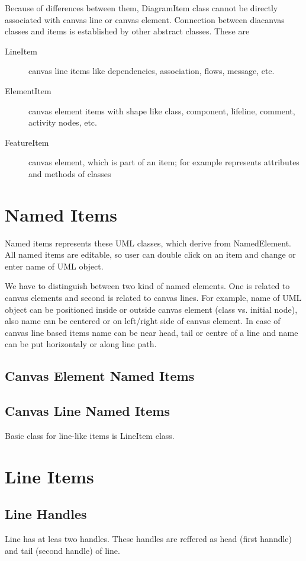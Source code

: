 \documentclass[draft]{article}
\begin{document}
Because of differences between them, DiagramItem class cannot be directly
associated with canvas line or canvas element. Connection between diacanvas
classes and items is established by other abstract classes. These are
\begin{description}
\item[LineItem]
    canvas line items like dependencies, association, flows, message, etc.

\item[ElementItem]
    canvas element items with shape like class, component, lifeline,
    comment, activity nodes, etc.
            
\item[FeatureItem]
    canvas element, which is part of an item; for example represents
    attributes and methods of classes 
\end{description}

\section{Named Items}

Named items represents these UML classes, which derive from NamedElement.
All named items are editable, so user can double click on an item and
change or enter name of UML object.

We have to distinguish between two kind of named elements. One is related
to canvas elements and second is related to canvas lines. For example, name
of UML object can be positioned inside or outside canvas element (class vs.
initial node), also name can be centered or on left/right side of canvas
element. In case of canvas line based items name can be near head, tail
or centre of a line and name can be put horizontaly or along line path.

\subsection{Canvas Element Named Items}


\subsection{Canvas Line Named Items}
Basic class for line-like items is LineItem class.

\section{Line Items}
\subsection{Line Handles}
Line has at leas two handles. These handles are reffered as head (first
hanndle) and tail (second handle) of line.
\end{document}
